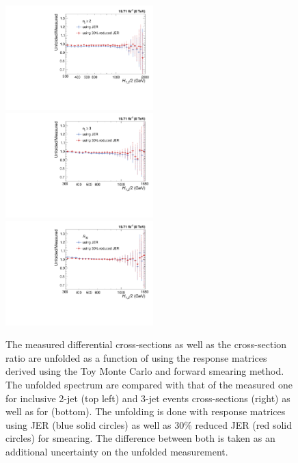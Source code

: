 \begin{figure}[!h]
 \begin{center}
 \hspace*{-3mm}\includegraphics[width=0.51\textwidth]{Plots_HT_2_150/Ratio_Unfolding_data_NLO_2.pdf}%
 ~~\includegraphics[width=0.51\textwidth]{Plots_HT_2_150/Ratio_Unfolding_data_NLO_3.pdf}\\
 \includegraphics[width=0.51\textwidth]{Plots_HT_2_150/Ratio_Unfolding_data_NLO_ratio32.pdf}
 \caption[The measured differential cross-sections as well as the cross-section ratio \ratio are unfolded as a function of \httwo using the response matrices derived using the Toy Monte Carlo and forward smearing method.]{The measured differential cross-sections as well as the cross-section ratio \ratio are unfolded as a function of \httwo using the response matrices derived using the Toy Monte Carlo and forward smearing method. The unfolded spectrum are compared with that of the measured one for inclusive 2-jet (top left) and 3-jet events cross-sections (right) as well as for \ratio (bottom). The unfolding is done with response matrices using JER (blue solid circles) as well as 30\% reduced JER (red solid circles) for smearing. The difference between both is taken as an additional uncertainty on the unfolded measurement.}
 \label{fig:unfolded_data}
 \end{center}
\end{figure}

